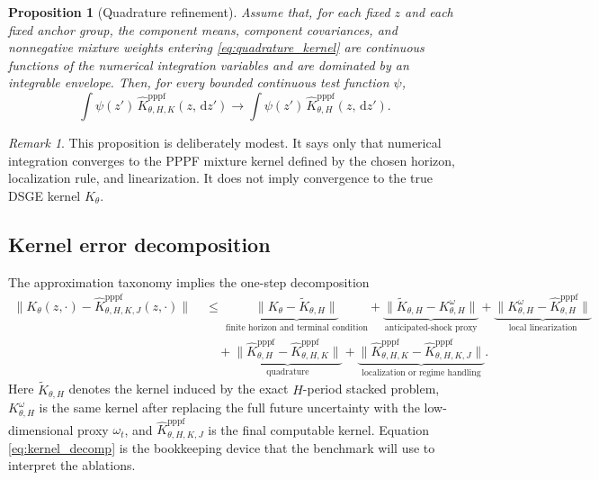 \documentclass[11pt]{article}
\newtheorem{proposition}{Proposition}
\theoremstyle{remark}
\newtheorem{remark}{Remark}
\newcommand{\dd}{\,\mathrm{d}}
\begin{document}
\begin{proposition}[Quadrature refinement]
Assume that, for each fixed $z$ and each fixed anchor group, the component means, component covariances, and nonnegative mixture weights entering \eqref{eq:quadrature_kernel} are continuous functions of the numerical integration variables and are dominated by an integrable envelope.
Then, for every bounded continuous test function $\psi$,
\[
\int \psi(z')\,\widehat K_{\theta,H,K}^{\mathrm{pppf}}(z,\dd z')
\to
\int \psi(z')\,\widehat K_{\theta,H}^{\mathrm{pppf}}(z,\dd z').
\]
\end{proposition}

\begin{remark}
This proposition is deliberately modest.
It says only that numerical integration converges to the PPPF mixture kernel defined by the chosen horizon, localization rule, and linearization.
It does not imply convergence to the true DSGE kernel $K_\theta$.
\end{remark}

\subsection{Kernel error decomposition}

The approximation taxonomy implies the one-step decomposition
\begin{align}
\|K_\theta(z,\cdot)-\widehat K_{\theta,H,K,J}^{\mathrm{pppf}}(z,\cdot)\|
\;&\le\;
\underbrace{\|K_\theta-\widetilde K_{\theta,H}\|}_{\text{finite horizon and terminal condition}}
+\underbrace{\|\widetilde K_{\theta,H}-K_{\theta,H}^{\omega}\|}_{\text{anticipated-shock proxy}}
+\underbrace{\|K_{\theta,H}^{\omega}-\widehat K_{\theta,H}^{\mathrm{pppf}}\|}_{\text{local linearization}}
\nonumber\\
&\quad
+\underbrace{\|\widehat K_{\theta,H}^{\mathrm{pppf}}-\widehat K_{\theta,H,K}^{\mathrm{pppf}}\|}_{\text{quadrature}}
+\underbrace{\|\widehat K_{\theta,H,K}^{\mathrm{pppf}}-\widehat K_{\theta,H,K,J}^{\mathrm{pppf}}\|}_{\text{localization or regime handling}}.
\label{eq:kernel_decomp}
\end{align}
Here $\widetilde K_{\theta,H}$ denotes the kernel induced by the exact $H$-period stacked problem, $K_{\theta,H}^{\omega}$ is the same kernel after replacing the full future uncertainty with the low-dimensional proxy $\omega_t$, and $\widehat K_{\theta,H,K,J}^{\mathrm{pppf}}$ is the final computable kernel.
Equation \eqref{eq:kernel_decomp} is the bookkeeping device that the benchmark will use to interpret the ablations.
\end{document}

